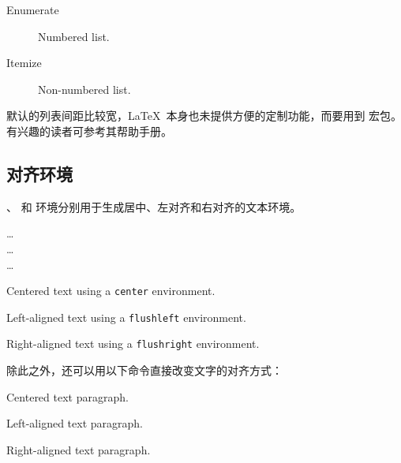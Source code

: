 \begin{example}
\begin{description}
  \item[Enumerate] Numbered list.
  \item[Itemize] Non-numbered list.
\end{description}
\end{example}

默认的列表间距比较宽，\LaTeX\ 本身也未提供方便的定制功能，而要用到  宏包。有兴趣的读者可参考其帮助手册。

\subsection{对齐环境}\label{subsec:flush}

、 和  环境分别用于生成居中、左对齐和右对齐的文本环境。
\begin{command}
 \ldots\  \\
 \ldots\  \\
 \ldots\ 
\end{command}

\begin{example}
\begin{center}
Centered text using a
\verb|center| environment.
\end{center}
\begin{flushleft}
Left-aligned text using a
\verb|flushleft| environment.
\end{flushleft}
\begin{flushright}
Right-aligned text using a
\verb|flushright| environment.
\end{flushright}
\end{example}

除此之外，还可以用以下命令直接改变文字的对齐方式：
\begin{command}
 \quad
{} \quad
{}
\end{command}

\begin{example}
\centering
Centered text paragraph.

\raggedright
Left-aligned text paragraph.

\raggedleft
Right-aligned text paragraph.
\end{example}

